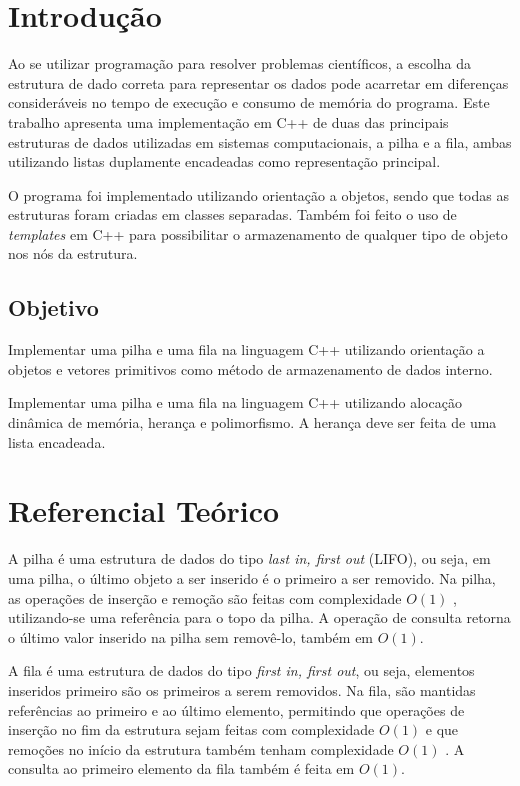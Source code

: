 
\chapter{Introdução}

Ao se utilizar programação para resolver problemas científicos, a escolha da estrutura de dado correta para representar os dados pode acarretar em diferenças consideráveis no tempo de execução e consumo de memória do programa. Este trabalho apresenta uma implementação em C++ de duas das principais estruturas de dados utilizadas em sistemas computacionais, a pilha e a fila, ambas utilizando listas duplamente encadeadas como representação principal.

O programa foi implementado utilizando orientação a objetos, sendo que todas as estruturas foram criadas em classes separadas. Também foi feito o uso de \emph{templates} em C++ para possibilitar o armazenamento de qualquer tipo de objeto nos nós da estrutura.

\section{Objetivo}

Implementar uma pilha e uma fila na linguagem C++ utilizando orientação a objetos e vetores primitivos como método de armazenamento de dados interno.

Implementar uma pilha e uma fila na linguagem C++ utilizando alocação dinâmica de memória, herança e polimorfismo. A herança deve ser feita de uma lista encadeada.

\chapter{Referencial Teórico}

A pilha é uma estrutura de dados do tipo \emph{last in, first out} (LIFO), ou seja, em uma pilha, o último objeto a ser inserido é o primeiro a ser removido. Na pilha, as operações de inserção e remoção são feitas com complexidade \(O(1)\) \cite{cormen_introduction_2009}, utilizando-se uma referência para o topo da pilha. A operação de consulta retorna o último valor inserido na pilha sem removê-lo, também em \(O(1)\).

A fila é uma estrutura de dados do tipo \emph{first in, first out}, ou seja, elementos inseridos primeiro são os primeiros a serem removidos. Na fila, são mantidas referências ao primeiro e ao último elemento, permitindo que operações de inserção no fim da estrutura sejam feitas com complexidade \(O(1)\) e que remoções no início da estrutura também tenham complexidade \(O(1)\) \cite{cormen_introduction_2009}. A consulta ao primeiro elemento da fila também é feita em \(O(1)\).

